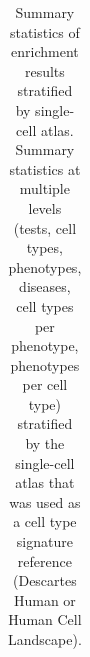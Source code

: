 \documentclass[
]{article}
\begin{document}
\begin{longtable}[]{@{}
  >{\raggedright\arraybackslash}p{}
  >{\raggedright\arraybackslash}p{}
  >{\raggedright\arraybackslash}p{}
  >{\raggedright\arraybackslash}p{}@{}}

\caption{\label{tbl-summary}Summary statistics of enrichment results
stratified by single-cell atlas. Summary statistics at multiple levels
(tests, cell types, phenotypes, diseases, cell types per phenotype,
phenotypes per cell type) stratified by the single-cell atlas that was
used as a cell type signature reference (Descartes Human or Human Cell
Landscape).}

\tabularnewline


\end{longtable}
\end{document}
